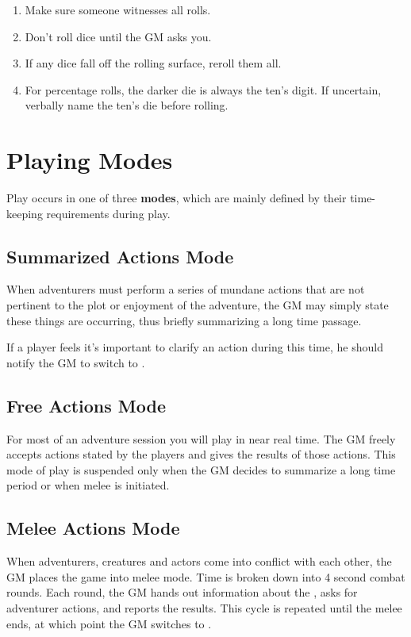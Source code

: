 \begin{multicols}{2}
\begin{enumerate}
\item Make sure someone witnesses all rolls.
\item Don't roll dice until the GM asks you.
\item If any dice fall off the rolling surface, reroll them all.
\item For percentage rolls, the darker die is always the ten's digit. If uncertain, verbally name the ten's die before rolling.
\end{enumerate}
\section{Playing Modes}
Play occurs in one of three \textbf{modes}, which are mainly defined by their time-keeping requirements during play.
\subsection{Summarized Actions Mode}
When adventurers must perform a series of mundane actions that are not pertinent to the plot or  enjoyment of the adventure, the GM may simply state these things are occurring, thus briefly summarizing a long time passage. 

If a player feels it's important to clarify an action during this time, he should notify the GM to switch to .

\subsection{Free Actions Mode}
For most of an adventure session you will play in near real time. The GM freely accepts actions stated by the players and gives the results of those actions. This mode of play is suspended only when the GM decides to summarize a long time period or when melee is initiated.
\subsection{Melee Actions Mode}
When adventurers, creatures and actors come into conflict with each other, the GM places the game into melee mode. Time is broken down into 4 second combat rounds. Each round, the GM hands out information about the , asks for adventurer actions, and reports the results. This cycle is repeated until the melee ends, at which point the GM switches to .


\end{multicols}
